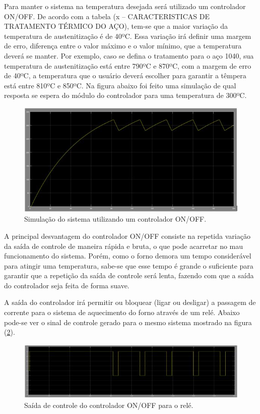 Para manter o sistema na temperatura desejada será utilizado um controlador ON/OFF. De acordo com a tabela (x – CARACTERISTICAS DE TRATAMENTO TÉRMICO DO AÇO), tem-se que a maior variação da temperatura de austenitização é de 40ºC. Essa variação irá definir uma margem de erro, diferença entre o valor máximo e o valor mínimo, que a temperatura deverá se manter. Por exemplo, caso se defina o tratamento para o aço 1040, sua temperatura de austenitização está entre 790ºC e 870ºC, com a margem de erro de 40ºC, a temperatura que o usuário deverá escolher para garantir a têmpera está entre 810ºC e 850ºC. Na figura abaixo foi feito uma simulação de qual resposta se espera do módulo do controlador para uma temperatura de 300ºC.

\begin{figure}[h]
	\centering
	\label{on_off}
	\includegraphics[keepaspectratio=true,scale=0.8]{figuras/on_off.JPG}
	\caption{Simulação do sistema utilizando um controlador ON/OFF.}
\end{figure}

A principal desvantagem do controlador ON/OFF consiste na repetida variação da saída de controle de maneira rápida e bruta, o que pode acarretar no mau funcionamento do sistema. Porém, como o forno demora um tempo considerável para atingir uma temperatura, sabe-se que esse tempo é grande o suficiente para garantir que a repetição da saída de controle será lenta, fazendo com que a saída do controlador seja feita de forma suave.

A saída do controlador irá permitir ou bloquear (ligar ou desligar) a passagem de corrente para o sistema de aquecimento do forno através de um relé. Abaixo pode-se ver o sinal de controle gerado para o mesmo sistema mostrado na figura (\ref{saida_controle}).

\begin{figure}[h]
	\centering
	\label{saida_controle}
	\includegraphics[keepaspectratio=true,scale=0.8]{figuras/saida_controle.JPG}
	\caption{Saída de controle do controlador ON/OFF para o relé.}
\end{figure}

